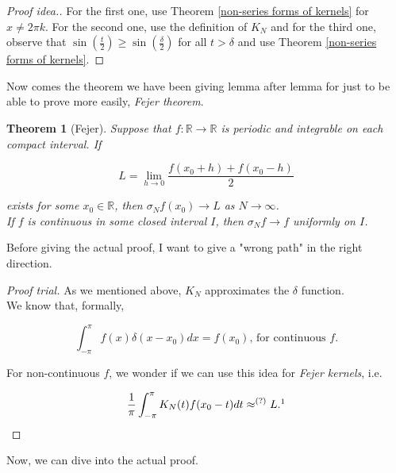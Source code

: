 \documentclass[12pt]{amsart}
\newtheorem{theorem}{Theorem}[section]
\theoremstyle{definition}
\begin{document}
\begin{proof}[Proof idea.]
    For the first one, use Theorem \ref{non-series forms of kernels} for $x \neq 2\pi k$. For the second one, use the definition of $K_N$ and for the third one, observe that $\sin(\frac{t}{2}) \geq \sin(\frac{\delta}{2})$ for all $t > \delta$ and use Theorem \ref{non-series forms of kernels}.
\end{proof}


Now comes the theorem we have been giving lemma after lemma for just to be able to prove more easily, \textit{Fejer theorem}.


\begin{theorem}[Fejer]
    Suppose that $f: \mathbb{R} \to \mathbb{R}$ is periodic and integrable on each compact interval. If 


        \begin{equation}
             L = \lim_{h \to 0} \frac{f(x_0 + h) + f(x_0 - h)}{2}
        \end{equation}

        exists for some $x_0 \in \mathbb{R}$, then $\sigma_Nf(x_0) \to L$ as $N \to \infty$.   \\
        If \(f\) is continuous in some closed interval $I$, then $\sigma_Nf \to f$ uniformly on $I$.

\end{theorem}


Before giving the actual proof, I want to give a "wrong path" in the right direction.


\begin{proof}[Proof trial]
    {As we mentioned above, $K_N$ approximates the $\delta$ function.}\\
   { We know that, formally,}

   
    \[
    \int_{-\pi}^{\pi}f(x)\delta(x - x_0)dx = f(x_0) \text{, for continuous $f$.}
    \]

    
    For non-continuous \(f\), we wonder if we can use this idea for \textit{Fejer kernels}, i.e.

    
    \[
    \frac{1}{\pi}\int_{-\pi}^{\pi} K_N(t)f(x_0 - t)dt \approx^{(?)} L.\footnotemark{}
    \] \qedhere

    

    
\end{proof}


Now, we can dive into the actual proof.
\end{document}
